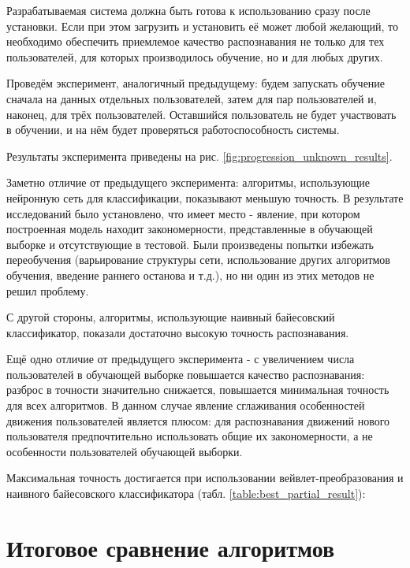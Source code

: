 Разрабатываемая система должна быть готова к использованию сразу после установки. Если при этом загрузить и установить её может любой желающий, то необходимо обеспечить приемлемое качество распознавания не только для тех пользователей, для которых производилось обучение, но и для любых других.

Проведём эксперимент, аналогичный предыдущему: будем запускать обучение сначала на данных отдельных пользователей, затем для пар пользователей и, наконец, для трёх пользователей. Оставшийся пользователь не будет участвовать в обучении, и на нём будет проверяться работоспособность системы.

Результаты эксперимента приведены на рис. \ref{fig:progression_unknown_results}.


Заметно отличие от предыдущего эксперимента: алгоритмы, использующие нейронную сеть для классификации, показывают меньшую точность. В результате исследований было установлено, что имеет место  - явление, при котором построенная модель находит закономерности, представленные в обучающей выборке и отсутствующие в тестовой. Были произведены попытки избежать переобучения (варьирование структуры сети, использование других алгоритмов обучения, введение раннего останова и т.д.), но ни один из этих методов не решил проблему.

С другой стороны, алгоритмы, использующие наивный байесовский классификатор, показали достаточно высокую точность распознавания.

Ещё одно отличие от предыдущего эксперимента - с увеличением числа пользователей в обучающей выборке повышается качество распознавания: разброс в точности значительно снижается, повышается минимальная точность для всех алгоритмов. В данном случае явление сглаживания особенностей движения пользователей является плюсом: для распознавания движений нового пользователя предпочтительно использовать общие их закономерности, а не особенности пользователей обучающей выборки.

Максимальная точность достигается при использовании вейвлет-преобразования и наивного байесовского классификатора (табл. \ref{table:best_partial_result}):



\section{Итоговое сравнение алгоритмов}

